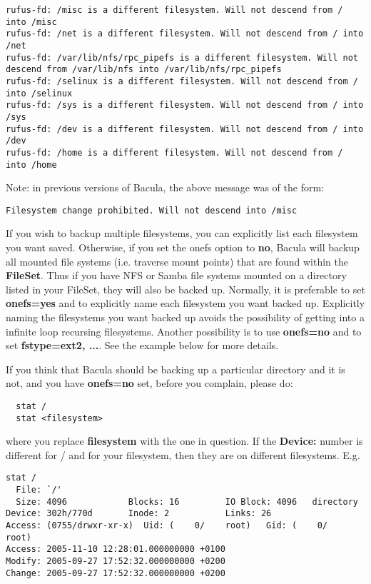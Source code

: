 \begin{description}
\footnotesize
\begin{verbatim}
rufus-fd: /misc is a different filesystem. Will not descend from / into /misc
rufus-fd: /net is a different filesystem. Will not descend from / into /net
rufus-fd: /var/lib/nfs/rpc_pipefs is a different filesystem. Will not descend from /var/lib/nfs into /var/lib/nfs/rpc_pipefs
rufus-fd: /selinux is a different filesystem. Will not descend from / into /selinux
rufus-fd: /sys is a different filesystem. Will not descend from / into /sys
rufus-fd: /dev is a different filesystem. Will not descend from / into /dev
rufus-fd: /home is a different filesystem. Will not descend from / into /home
\end{verbatim}
\normalsize

   Note: in previous versions of Bacula, the above message was of the form: 

\footnotesize
\begin{verbatim}
Filesystem change prohibited. Will not descend into /misc
\end{verbatim}
\normalsize

   If you wish to backup multiple filesystems, you can  explicitly
   list each filesystem you want saved.  Otherwise, if you set the onefs option
   to {\bf no}, Bacula will backup  all mounted file systems (i.e. traverse mount
   points) that  are found within the {\bf FileSet}. Thus if  you have NFS or
   Samba file systems mounted on a directory listed  in your FileSet, they will
   also be backed up. Normally, it is  preferable to set {\bf onefs=yes} and to
   explicitly name  each filesystem you want backed up. Explicitly naming  the
   filesystems you want backed up avoids the possibility  of getting into a
   infinite loop recursing filesystems.  Another possibility is to 
   use {\bf onefs=no} and to set {\bf fstype=ext2, ...}.             
   See the example below for more details. 

   If you think that Bacula should be backing up a particular directory
   and it is not, and you have {\bf onefs=no} set, before you complain,
   please do:

\footnotesize
\begin{verbatim}
  stat /
  stat <filesystem>
\end{verbatim}
\normalsize

where you replace {\bf filesystem} with the one in question.  If the 
{\bf Device:} number is different for / and for your filesystem, then they
are on different filesystems.  E.g.
\footnotesize
\begin{verbatim}
stat /
  File: `/'
  Size: 4096            Blocks: 16         IO Block: 4096   directory
Device: 302h/770d       Inode: 2           Links: 26
Access: (0755/drwxr-xr-x)  Uid: (    0/    root)   Gid: (    0/    root)
Access: 2005-11-10 12:28:01.000000000 +0100
Modify: 2005-09-27 17:52:32.000000000 +0200
Change: 2005-09-27 17:52:32.000000000 +0200


\end{verbatim}
\end{description}
